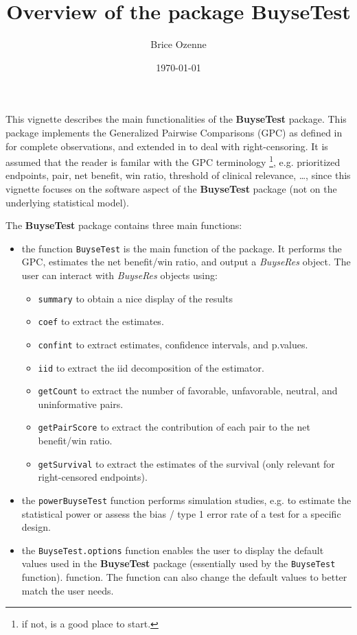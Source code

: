 \documentclass[12pt]{article}
\author{Brice Ozenne}
\date{\today}
\title{Overview of the package BuyseTest}
\begin{document}
\maketitle
This vignette describes the main functionalities of the \textbf{BuyseTest}
package. This package implements the Generalized Pairwise Comparisons
(GPC) as defined in \cite{buyse2010generalized} for complete
observations, and extended in \cite{peron2018extension} to deal with
right-censoring. It is assumed that the reader is familar with the GPC
terminology \footnote{if not, \cite{buyse2010generalized} is a good place to
start.}, e.g. prioritized endpoints, pair, net benefit, win ratio,
threshold of clinical relevance, \ldots, since this vignette focuses
on the software aspect of the \textbf{BuyseTest} package (not on the
underlying statistical model).

\bigskip

The \textbf{BuyseTest} package contains three main functions:
\begin{itemize}
\item the function \texttt{BuyseTest} is the main function of the package. It
performs the GPC, estimates the net benefit/win ratio, and output a
\emph{BuyseRes} object. The user can interact with \emph{BuyseRes} objects using:
\begin{itemize}
\item \texttt{summary} to obtain a nice display of the results
\item \texttt{coef} to extract the estimates.
\item \texttt{confint} to extract estimates, confidence intervals, and p.values.
\item \texttt{iid} to extract the iid decomposition of the estimator.
\item \texttt{getCount} to extract the number of favorable, unfavorable, neutral, and uninformative pairs.
\item \texttt{getPairScore} to extract the contribution of each pair to the net benefit/win ratio.
\item \texttt{getSurvival} to extract the estimates of the survival (only relevant for right-censored endpoints).
\end{itemize}
\item the \texttt{powerBuyseTest} function performs simulation studies,
e.g. to estimate the statistical power or assess the bias / type 1
error rate of a test for a specific design.
\item the \texttt{BuyseTest.options} function enables the user to display the
default values used in the \textbf{BuyseTest} package (essentially used by
the \texttt{BuyseTest} function). function. The function can also change
the default values to better match the user needs.
\end{itemize}
\end{document}
